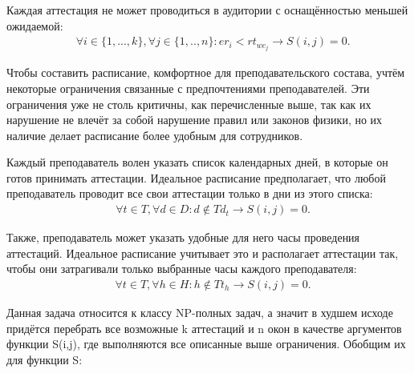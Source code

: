 Каждая аттестация не может проводиться в аудитории с оснащённостью меньшей ожидаемой:
\begin{align}
	& \forall i \in \{1,...,k\}, \forall j \in \{1,..,n\} : er_i < rt_{wc_j} \rightarrow S(i,j) = 0.
\end{align}

Чтобы составить расписание, комфортное для преподавательского состава, учтём некоторые ограничения связанные с предпочтениями преподавателей. Эти ограничения уже не столь критичны, как перечисленные выше, так как их нарушение не влечёт за собой нарушение правил или законов физики, но их наличие делает расписание более удобным для сотрудников.

Каждый преподаватель волен указать список календарных дней, в которые он готов принимать аттестации. Идеальное расписание предполагает, что любой преподаватель проводит все свои аттестации только в дни из этого списка:
\begin{align}
	\label{eq:T1}
	& \forall t \in T, \forall d \in D : d \notin Td_t \rightarrow S(i,j) = 0.
\end{align}

Также, преподаватель может указать удобные для него часы проведения аттестаций. Идеальное расписание учитывает это и располагает аттестации так, чтобы они затрагивали только выбранные часы каждого преподавателя:
\begin{align}
	\label{eq:T2}
	& \forall t \in T, \forall h \in H : h \notin Tt_h \rightarrow S(i,j) = 0.
\end{align}

Данная задача относится к классу NP-полных задач, а значит в худшем исходе придётся перебрать все возможные k аттестаций и n окон в качестве аргументов функции S(i,j), где выполняются все описанные выше ограничения. Обобщим их для функции S:


